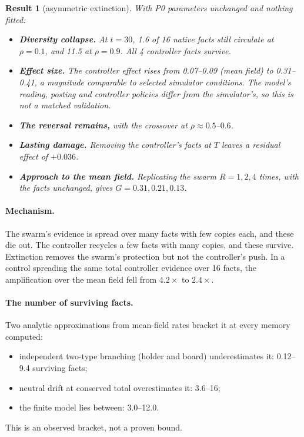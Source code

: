 \documentclass[10pt,a4paper]{article}
\newtheorem{result}{Result}
\theoremstyle{definition}
\begin{document}
\begin{result}[asymmetric extinction]
With P0 parameters unchanged and nothing fitted:
\begin{itemize}
\item \textbf{Diversity collapse.} At $t=30$, 1.6 of 16 native facts still circulate at $\rho=0.1$, and 11.5 at
  $\rho=0.9$. All 4 controller facts survive.
\item \textbf{Effect size.} The controller effect rises from 0.07--0.09 (mean field) to 0.31--0.41, a magnitude
  comparable to selected simulator conditions. The model's reading, posting and controller policies differ from the
  simulator's, so this is not a matched validation.
\item \textbf{The reversal remains,} with the crossover at $\rho\approx0.5$--$0.6$.
\item \textbf{Lasting damage.} Removing the controller's facts at $T$ leaves a residual effect of $+0.036$.
\item \textbf{Approach to the mean field.} Replicating the swarm $R=1,2,4$ times, with the facts unchanged, gives
  $G=0.31,0.21,0.13$.
\end{itemize}
\end{result}

\paragraph{Mechanism.} The swarm's evidence is spread over many facts with few copies each, and these die out. The
controller recycles a few facts with many copies, and these survive. Extinction removes the swarm's protection but not
the controller's push. In a control spreading the same total controller evidence over 16 facts, the amplification over
the mean field fell from $4.2\times$ to $2.4\times$.

\paragraph{The number of surviving facts.} Two analytic approximations from mean-field rates bracket it at every memory
computed:
\begin{itemize}
\item independent two-type branching (holder and board) underestimates it: 0.12--9.4 surviving facts;
\item neutral drift at conserved total overestimates it: 3.6--16;
\item the finite model lies between: 3.0--12.0.
\end{itemize}
This is an observed bracket, not a proven bound.
\end{document}
